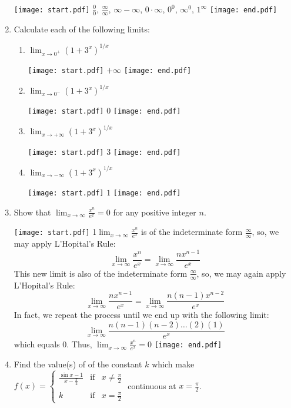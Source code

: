 \documentclass[12pt]{article}
\begin{document}
\begin{enumerate}
\texttt{[image: start.pdf]}
{{$\frac{0}{0}$, $\frac{\infty}{\infty}$, $\infty-\infty$, $0 \cdot \infty$, ${0}^{0}$, ${\infty}^{0}$, $1^{\infty}$}}
\texttt{[image: end.pdf]}


\item Calculate each of the following limits:

\begin{enumerate}

\item $\lim_{x \rightarrow 0^{+}}{(1+3^x)^{1/x}}$

\texttt{[image: start.pdf]}
{{$+\infty$}}
\texttt{[image: end.pdf]}


\item $\lim_{x \rightarrow 0^{-}}{(1+3^x)^{1/x}}$

\texttt{[image: start.pdf]}
{{$0$}}
\texttt{[image: end.pdf]}


\item $\lim_{x \rightarrow +\infty}{(1+3^x)^{1/x}}$

\texttt{[image: start.pdf]}
{{$3$}}
\texttt{[image: end.pdf]}


\item $\lim_{x \rightarrow -\infty}{(1+3^x)^{1/x}}$

\texttt{[image: start.pdf]}
{{$1$}}
\texttt{[image: end.pdf]}


\end{enumerate}

\item Show that $\lim_{x \rightarrow \infty}{\frac{x^n}{e^x}}=0$ for any positive integer $n$.

\texttt{[image: start.pdf]}
{{{1\linewidth}{$\lim_{x \rightarrow \infty}{\frac{x^n}{e^x}}$ is of the indeterminate form $\frac{\infty}{\infty}$, so, we may apply L'Hopital's Rule:
$$\lim_{x \rightarrow \infty}{\frac{x^n}{e^x}}=\lim_{x \rightarrow \infty}{\frac{nx^{n-1}}{e^x}}$$
This new limit is also of the indeterminate form $\frac{\infty}{\infty}$, so, we may again apply L'Hopital's Rule:
$$\lim_{x \rightarrow \infty}{\frac{nx^{n-1}}{e^x}}=\lim_{x \rightarrow \infty}{\frac{n(n-1)x^{n-2}}{e^x}}$$
In fact, we repeat the process until we end up with the following limit:
$$\lim_{x \rightarrow \infty}{\frac{n(n-1)(n-2)\dots(2)(1)}{e^x}}$$
which equals 0.  Thus, $\lim_{x \rightarrow \infty}{\frac{x^n}{e^x}}=0$}}}
\texttt{[image: end.pdf]}


\item Find the value(s) of of the constant $k$ which make $f(x)=\left\{\begin{array}{lll}
\frac{\sin{x}-1}{x-\frac{\pi}{2}} & \text{if} & x \neq \frac{\pi}{2}\\
&&\\
k & \text{if} & x=\frac{\pi}{2}
\end{array}\right.$ continuous at $x=\frac{\pi}{2}$.


\end{enumerate}
\end{document}
